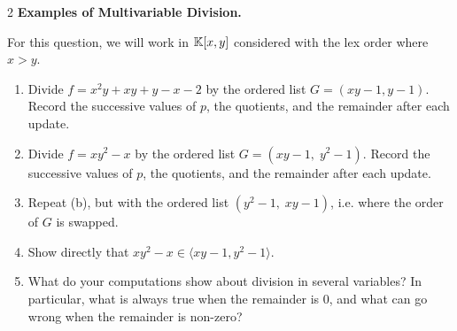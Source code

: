 \documentclass[Notebook.tex]{subfiles}
\begin{document}
\begin{problem}{2} \textbf{Examples of Multivariable Division.} 
    
    For this question, we will work in $\mathbb K[x,y]$ considered with the lex order where $x>y$.
    \begin{enumerate}
        \item Divide $f=x^2y+xy+y-x-2$ by the ordered list $G=(xy-1, y-1)$. Record the successive values of $p$, the quotients, and the remainder after each update.
        
        \item Divide $f=xy^2-x$ by the ordered list $G=(xy-1,\; y^2-1)$. Record the successive values of $p$, the quotients, and the remainder after each update. 

        \item Repeat (b), but with the ordered list $(y^2-1,\; xy-1)$, i.e. where the order of $G$ is swapped. 
        
        \item Show directly that $xy^2-x\in \langle xy-1, y^2-1\rangle$. 
        
        \item What do your computations show about division in several variables? In particular, what is always true when the remainder is $0$, and what can go wrong when the remainder is non-zero? 
    \end{enumerate}
\end{problem}
\end{document}

